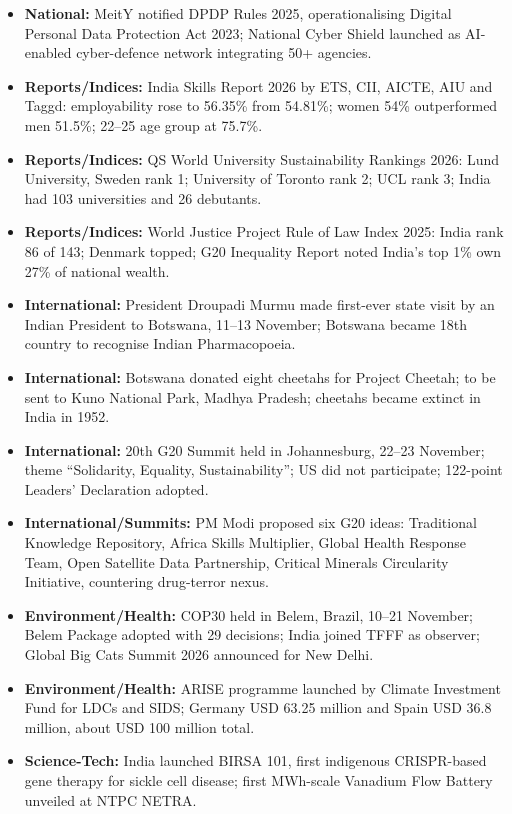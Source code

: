 \documentclass[10pt,a4paper]{article}
\begin{document}
\begin{itemize}
    \item \textbf{National:} MeitY notified DPDP Rules 2025, operationalising Digital Personal Data Protection Act 2023; National Cyber Shield launched as AI-enabled cyber-defence network integrating 50+ agencies.
    \item \textbf{Reports/Indices:} India Skills Report 2026 by ETS, CII, AICTE, AIU and Taggd: employability rose to 56.35\% from 54.81\%; women 54\% outperformed men 51.5\%; 22--25 age group at 75.7\%.
    \item \textbf{Reports/Indices:} QS World University Sustainability Rankings 2026: Lund University, Sweden rank 1; University of Toronto rank 2; UCL rank 3; India had 103 universities and 26 debutants.
    \item \textbf{Reports/Indices:} World Justice Project Rule of Law Index 2025: India rank 86 of 143; Denmark topped; G20 Inequality Report noted India's top 1\% own 27\% of national wealth.
    \item \textbf{International:} President Droupadi Murmu made first-ever state visit by an Indian President to Botswana, 11--13 November; Botswana became 18th country to recognise Indian Pharmacopoeia.
    \item \textbf{International:} Botswana donated eight cheetahs for Project Cheetah; to be sent to Kuno National Park, Madhya Pradesh; cheetahs became extinct in India in 1952.
    \item \textbf{International:} 20th G20 Summit held in Johannesburg, 22--23 November; theme ``Solidarity, Equality, Sustainability''; US did not participate; 122-point Leaders' Declaration adopted.
    \item \textbf{International/Summits:} PM Modi proposed six G20 ideas: Traditional Knowledge Repository, Africa Skills Multiplier, Global Health Response Team, Open Satellite Data Partnership, Critical Minerals Circularity Initiative, countering drug-terror nexus.
    \item \textbf{Environment/Health:} COP30 held in Belem, Brazil, 10--21 November; Belem Package adopted with 29 decisions; India joined TFFF as observer; Global Big Cats Summit 2026 announced for New Delhi.
    \item \textbf{Environment/Health:} ARISE programme launched by Climate Investment Fund for LDCs and SIDS; Germany USD 63.25 million and Spain USD 36.8 million, about USD 100 million total.
    \item \textbf{Science-Tech:} India launched BIRSA 101, first indigenous CRISPR-based gene therapy for sickle cell disease; first MWh-scale Vanadium Flow Battery unveiled at NTPC NETRA.

\end{itemize}
\end{document}
